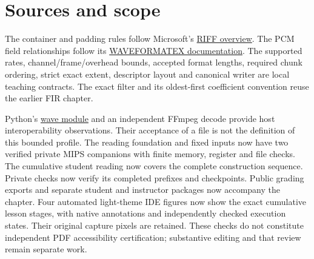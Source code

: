 \enlargethispage{3\baselineskip}
\section{Sources and scope}
The container and padding rules follow Microsoft's
\href{https://learn.microsoft.com/en-us/windows/win32/xaudio2/resource-interchange-file-format--riff-}{RIFF overview}.
The PCM field relationships follow its
\href{https://learn.microsoft.com/en-us/windows/win32/api/mmeapi/ns-mmeapi-waveformatex}{WAVEFORMATEX documentation}.
The supported rates, channel/frame/overhead bounds, accepted format lengths, required
chunk ordering, strict exact extent, descriptor layout and canonical writer are local
teaching contracts. The exact filter and its oldest-first coefficient convention
reuse the earlier FIR chapter.

Python's \href{https://docs.python.org/3/library/wave.html}{wave module} and an
independent FFmpeg decode provide host interoperability observations. Their acceptance
of a file is not the definition of this bounded profile. The reading foundation and fixed inputs now have two verified private MIPS
companions with finite memory, register and file checks. The cumulative student reading now covers the complete construction sequence.
Private checks now verify its completed prefixes and checkpoints. Public grading exports and separate student and instructor packages now accompany
the chapter. Four automated light-theme IDE figures now show the exact cumulative lesson stages,
with native annotations and independently checked execution states. Their original
capture pixels are retained. These checks do not constitute independent PDF accessibility
certification; substantive editing and that review remain separate work.
